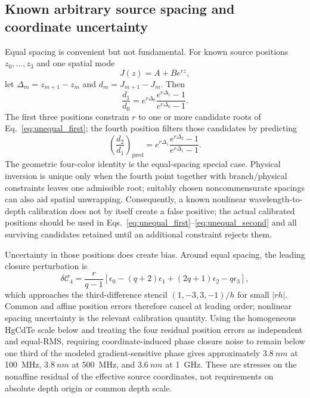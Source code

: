 \documentclass[11pt]{article}
\newcommand{\Cfour}{\mathcal{C}_4}
\begin{document}
\subsection{Known arbitrary source spacing and coordinate uncertainty}

Equal spacing is convenient but not fundamental. For known source positions $z_0,\ldots,z_3$ and one spatial mode
\begin{equation}
J(z)=A+B e^{rz},
\end{equation}
let $\Delta_m=z_{m+1}-z_m$ and $d_m=J_{m+1}-J_m$. Then
\begin{equation}
\boxed{
\frac{d_1}{d_0}
=e^{r\Delta_0}
\frac{e^{r\Delta_1}-1}{e^{r\Delta_0}-1}.}
\label{eq:unequal_first}
\end{equation}
The first three positions constrain $r$ to one or more candidate roots of Eq.~\eqref{eq:unequal_first}; the fourth position filters those candidates by predicting
\begin{equation}
\boxed{
\left(\frac{d_2}{d_1}\right)_{\mathrm{pred}}
=e^{r\Delta_1}
\frac{e^{r\Delta_2}-1}{e^{r\Delta_1}-1}.}
\label{eq:unequal_second}
\end{equation}
The geometric four-color identity is the equal-spacing special case. Physical inversion is unique only when the fourth point together with branch/physical constraints leaves one admissible root; suitably chosen noncommensurate spacings can also aid spatial unwrapping. Consequently, a known nonlinear wavelength-to-depth calibration does not by itself create a false positive; the actual calibrated positions should be used in Eqs.~\eqref{eq:unequal_first}--\eqref{eq:unequal_second} and all surviving candidates retained until an additional constraint rejects them.

Uncertainty in those positions does create bias. Around equal spacing, the leading closure perturbation is
\begin{equation}
\delta\Cfour
=\frac{r}{q-1}\left[\epsilon_0-(q+2)\epsilon_1+(2q+1)\epsilon_2-q\epsilon_3\right],
\end{equation}
which approaches the third-difference stencil $(1,-3,3,-1)/h$ for small $|rh|$. Common and affine position errors therefore cancel at leading order; nonlinear spacing uncertainty is the relevant calibration quantity. Using the homogeneous HgCdTe scale below and treating the four residual position errors as independent and equal-RMS, requiring coordinate-induced phase closure noise to remain below one third of the modeled gradient-sensitive phase gives approximately $3.8~\si{nm}$ at \SI{100}{MHz}, $3.8~\si{nm}$ at \SI{500}{MHz}, and $3.6~\si{nm}$ at \SI{1}{GHz}. These are stresses on the nonaffine residual of the effective source coordinates, not requirements on absolute depth origin or common depth scale.
\end{document}

